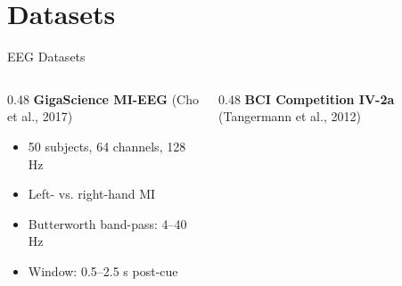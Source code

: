 \documentclass[aspectratio=169]{beamer}
\begin{document}
\section{Datasets}
\begin{frame}{EEG Datasets}


\begin{columns}[T,totalwidth=\textwidth]

\begin{column}{0.48\textwidth}
\centering
\textbf{\normalsize GigaScience MI-EEG} {\scriptsize (Cho et al., 2017)}

\vspace{0.10cm}


\vspace{0.12cm}

\raggedright
\begin{itemize}\itemsep1pt
    \item 50 subjects, 64 channels, 128 Hz
    \item Left- vs. right-hand MI
    \item Butterworth band-pass: 4--40 Hz
    \item Window: 0.5--2.5 s post-cue
\end{itemize}

\end{column}

\begin{column}{0.48\textwidth}
\centering
\textbf{\normalsize BCI Competition IV-2a} {\scriptsize (Tangermann et al., 2012)}



\end{column}
\end{columns}
\end{frame}
\end{document}
